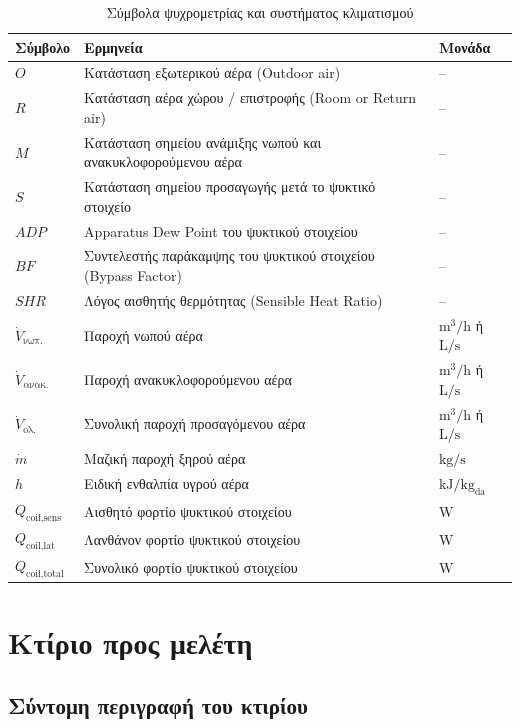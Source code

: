 \documentclass[12pt,a4paper]{article}
\begin{document}
\begin{table}[H]
\centering
\small
\caption{Σύμβολα ψυχρομετρίας και συστήματος κλιματισμού}
\begin{tabularx}{\textwidth}{C{2.8cm} L C{2.6cm}}
\toprule
\textbf{Σύμβολο} & \textbf{Ερμηνεία} & \textbf{Μονάδα} \\
\midrule
\(O\) & Κατάσταση εξωτερικού αέρα (\textenglish{Outdoor air}) & -- \\
\(R\) & Κατάσταση αέρα χώρου / επιστροφής (\textenglish{Room or Return air}) & -- \\
\(M\) & Κατάσταση σημείου ανάμιξης νωπού και ανακυκλοφορούμενου αέρα & -- \\
\(S\) & Κατάσταση σημείου προσαγωγής μετά το ψυκτικό στοιχείο & -- \\
\(ADP\) & \textenglish{Apparatus Dew Point} του ψυκτικού στοιχείου & -- \\
\(BF\) & Συντελεστής παράκαμψης του ψυκτικού στοιχείου (\textenglish{Bypass Factor}) & -- \\
\(SHR\) & Λόγος αισθητής θερμότητας (\textenglish{Sensible Heat Ratio}) & -- \\
\(\dot V_{\text{νωπ.}}\) & Παροχή νωπού αέρα & \(\mathrm{m^3/h}\) ή \(\mathrm{L/s}\) \\
\(\dot V_{\text{ανακ.}}\) & Παροχή ανακυκλοφορούμενου αέρα & \(\mathrm{m^3/h}\) ή \(\mathrm{L/s}\) \\
\(\dot V_{\text{ολ.}}\) & Συνολική παροχή προσαγόμενου αέρα & \(\mathrm{m^3/h}\) ή \(\mathrm{L/s}\) \\
\(\dot m\) & Μαζική παροχή ξηρού αέρα & \(\mathrm{kg/s}\) \\
\(h\) & Ειδική ενθαλπία υγρού αέρα & \(\mathrm{kJ/kg_{da}}\) \\
\(Q_{\text{coil,sens}}\) & Αισθητό φορτίο ψυκτικού στοιχείου & \(\mathrm{W}\) \\
\(Q_{\text{coil,lat}}\) & Λανθάνον φορτίο ψυκτικού στοιχείου & \(\mathrm{W}\) \\
\(Q_{\text{coil,total}}\) & Συνολικό φορτίο ψυκτικού στοιχείου & \(\mathrm{W}\) \\
\bottomrule
\end{tabularx}
\end{table}

\section{Κτίριο προς μελέτη}

\subsection{Σύντομη περιγραφή του κτιρίου}
\end{document}

